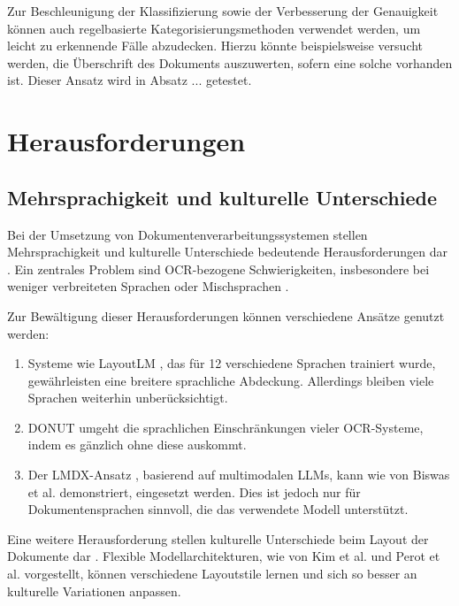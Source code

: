 Zur Beschleunigung der Klassifizierung sowie der Verbesserung der Genauigkeit können auch regelbasierte Kategorisierungsmethoden verwendet werden, um leicht zu erkennende Fälle abzudecken. Hierzu könnte beispielsweise versucht werden, die Überschrift des Dokuments auszuwerten, sofern eine solche vorhanden ist. Dieser Ansatz wird in Absatz ... getestet.

\section{Herausforderungen}
\label{sec:herausforderungen-und-offene-probleme}

\subsection{Mehrsprachigkeit und kulturelle Unterschiede}
\label{subsec:mehrsprachigkeit-und-kulturelle-unterschiede}

Bei der Umsetzung von Dokumentenverarbeitungssystemen stellen Mehrsprachigkeit und kulturelle Unterschiede bedeutende Herausforderungen dar \cite{XuYiheng2020LPoT, SubramaniNishant2021ASoD}. Ein zentrales Problem sind \gls{OCR}-bezogene Schwierigkeiten, insbesondere bei weniger verbreiteten Sprachen oder Mischsprachen \cite{OlejniczakKrzysztof2023TDFA}.

Zur Bewältigung dieser Herausforderungen können verschiedene Ansätze genutzt werden:

\begin{enumerate}
    \item Systeme wie LayoutLM \cite{XuYiheng2020LPoT}, das für 12 verschiedene Sprachen trainiert wurde, gewährleisten eine breitere sprachliche Abdeckung. Allerdings bleiben viele Sprachen weiterhin unberücksichtigt.
    
    \item \gls{DONUT} \cite{KimGeewook2022ODUT} umgeht die sprachlichen Einschränkungen vieler \gls{OCR}-Systeme, indem es gänzlich ohne diese auskommt.
    
    \item Der \gls{LMDX}-Ansatz \cite{PerotVincent2024LLMD}, basierend auf multimodalen \glspl{LLM}, kann wie von Biswas et al. \cite{BiswasAnjanava2024RoSD} demonstriert, eingesetzt werden. Dies ist jedoch nur für Dokumentensprachen sinnvoll, die das verwendete Modell unterstützt.
\end{enumerate}

Eine weitere Herausforderung stellen kulturelle Unterschiede beim Layout der Dokumente dar \cite{KimGeewook2022ODUT}. Flexible Modellarchitekturen, wie von Kim et al. \cite{KimGeewook2022ODUT} und Perot et al. \cite{PerotVincent2024LLMD} vorgestellt, können verschiedene Layoutstile lernen und sich so besser an kulturelle Variationen anpassen.


